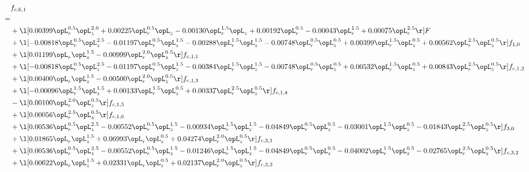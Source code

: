 \begin{alignat}{2} 
\label{eq:f_61_1} 
& f_{c,6,1} \nonumber \\ 
 = \\ 
& + \l[  0.00399 \opL_r^{0.5} \opL_z^{2.0} +  0.00225 \opL_r^{0.5} \opL_z   -0.00130 \opL_r^{1.5} \opL_z +  0.00192 \opL_r^{0.5}   -0.00043 \opL_r^{1.5} +  0.00075 \opL_r^{2.5}  \r] F \nonumber \\ 
& + \l[  -0.00818 \opL_r^{0.5} \opL_z^{2.5}   -0.01197 \opL_r^{0.5} \opL_z^{1.5}   -0.00288 \opL_r^{1.5} \opL_z^{1.5}   -0.00748 \opL_r^{0.5} \opL_z^{0.5} +  0.00399 \opL_r^{1.5} \opL_z^{0.5} +  0.00562 \opL_r^{2.5} \opL_z^{0.5}  \r] f_{1,0} \nonumber \\ 
& + \l[  0.01199 \opL_r \opL_z^{1.5}   -0.00999 \opL_r^{2.0} \opL_z^{0.5}  \r] f_{c,1,1} \nonumber \\ 
& + \l[  -0.00818 \opL_r^{0.5} \opL_z^{2.5}   -0.01197 \opL_r^{0.5} \opL_z^{1.5}   -0.00384 \opL_r^{1.5} \opL_z^{1.5}   -0.00748 \opL_r^{0.5} \opL_z^{0.5} +  0.00532 \opL_r^{1.5} \opL_z^{0.5} +  0.00843 \opL_r^{2.5} \opL_z^{0.5}  \r] f_{c,1,2} \nonumber \\ 
& + \l[  0.00400 \opL_r \opL_z^{1.5}   -0.00500 \opL_r^{2.0} \opL_z^{0.5}  \r] f_{c,1,3} \nonumber \\ 
& + \l[  -0.00096 \opL_r^{1.5} \opL_z^{1.5} +  0.00133 \opL_r^{1.5} \opL_z^{0.5} +  0.00337 \opL_r^{2.5} \opL_z^{0.5}  \r] f_{c,1,4} \nonumber \\ 
& - \l[  0.00100 \opL_r^{2.0} \opL_z^{0.5}  \r] f_{c,1,5} \nonumber \\ 
& + \l[  0.00056 \opL_r^{2.5} \opL_z^{0.5}  \r] f_{c,1,6} \nonumber \\ 
& + \l[  0.00536 \opL_r^{0.5} \opL_z^{2.5}   -0.00552 \opL_r^{0.5} \opL_z^{1.5}   -0.00934 \opL_r^{1.5} \opL_z^{1.5}   -0.04849 \opL_r^{0.5} \opL_z^{0.5}   -0.03001 \opL_r^{1.5} \opL_z^{0.5}   -0.01843 \opL_r^{2.5} \opL_z^{0.5}  \r] f_{3,0} \nonumber \\ 
& + \l[  0.01865 \opL_r \opL_z^{1.5} +  0.06993 \opL_r \opL_z^{0.5} +  0.04274 \opL_r^{2.0} \opL_z^{0.5}  \r] f_{c,3,1} \nonumber \\ 
& + \l[  0.00536 \opL_r^{0.5} \opL_z^{2.5}   -0.00552 \opL_r^{0.5} \opL_z^{1.5}   -0.01246 \opL_r^{1.5} \opL_z^{1.5}   -0.04849 \opL_r^{0.5} \opL_z^{0.5}   -0.04002 \opL_r^{1.5} \opL_z^{0.5}   -0.02765 \opL_r^{2.5} \opL_z^{0.5}  \r] f_{c,3,2} \nonumber \\ 
& + \l[  0.00622 \opL_r \opL_z^{1.5} +  0.02331 \opL_r \opL_z^{0.5} +  0.02137 \opL_r^{2.0} \opL_z^{0.5}  \r] f_{c,3,3} \nonumber \\ 

\end{alignat}
